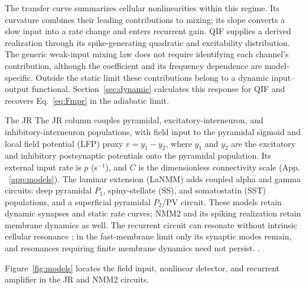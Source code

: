 \documentclass[11pt,a4paper]{article}
\providecommand{\DIFaddtex}[1]{{\protect\color{blue} \sf #1}} %
\providecommand{\DIFdeltex}[1]{{\protect\color{red} \scriptsize #1}} %
\providecommand{\DIFaddbegin}{} %
\providecommand{\DIFaddend}{} %
\providecommand{\DIFdelbegin}{} %
\providecommand{\DIFdelend}{} %
\providecommand{\DIFadd}[1]{\texorpdfstring{\DIFaddtex{#1}}{#1}} %
\providecommand{\DIFdel}[1]{\texorpdfstring{\DIFdeltex{#1}}{}} %
\begin{document}
\DIFdel{The transfer curve summarizes cellular nonlinearities within this regime. Its
curvature combines their leading contributions to mixing; its slope converts a
slow input into a rate change and enters recurrent gain. QIF supplies a derived
realization through its spike-generating quadratic and excitability distribution.
The generic weak-input mixing law does not require identifying each channel's
contribution, although the coefficient and its frequency dependence are
model-specific. Outside the static limit these contributions belong to a dynamic
input--output functional. Section~\ref{sec:dynamic} calculates this response for
QIF and recovers Eq.~\eqref{eq:Fmpr} in the adiabatic limit.
}%

\DIFdel{The JR }\DIFdelend \DIFaddbegin \DIFadd{The JR }\DIFaddend column couples pyramidal, excitatory-interneuron, and inhibitory-interneuron
populations, with field input to the pyramidal sigmoid and local field potential
(LFP) proxy $v=y_1-y_2$, where $y_1$ and $y_2$ are the excitatory and inhibitory
postsynaptic potentials onto the pyramidal population. Its external input rate is
$p$ (s$^{-1}$), and $C$ is the dimensionless connectivity scale\DIFdelbegin \DIFdel{(App.
~\ref{app:models}). The laminar extension (LaNMM)
\cite{ruffini2025cfc,sanchezTodo2023} adds coupled alpha and gamma circuits: deep
pyramidal $P_1$, spiny-stellate (SS), and somatostatin (SST) populations, and a
superficial pyramidal $P_2$/PV circuit. These models retain dynamic synapses and
static rate curves; NMM2 and its spiking realization retain membrane dynamics as well.
The recurrent circuit can resonate without intrinsic cellular resonance
\cite{brunelhakim1999,brunelwang2003}; in the fast-membrane limit only its synaptic
modes remain, and resonances requiring finite membrane dynamics need not persist.
}\DIFdelend \DIFaddbegin \DIFadd{.
}\DIFaddend

Figure~\ref{fig:models} locates the field input, nonlinear detector, and
recurrent amplifier in the JR and \DIFdelbegin \DIFdel{NMM2 circuits.
}%
\end{document}
